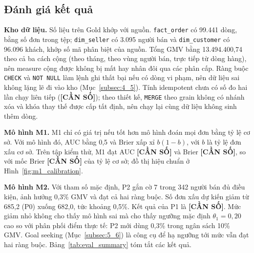 \documentclass[a4paper]{article}
\begin{document}
\subsection{Đánh giá kết quả}
\label{subsec:6_2}

\textbf{Kho dữ liệu.} Số liệu trên Gold khớp với nguồn. \texttt{fact\_order} có 99.441 dòng, bằng số đơn trong tệp; \texttt{dim\_seller} có 3.095 người bán và \texttt{dim\_customer} có 96.096 khách, khớp số mã phân biệt của nguồn. Tổng GMV bằng 13.494.400,74 theo cả ba cách cộng (theo tháng, theo vùng người bán, trực tiếp từ dòng hàng), nên measure cộng được không bị mất hay nhân đôi qua các phân cấp. Ràng buộc \texttt{CHECK} và \texttt{NOT NULL} làm lệnh ghi thất bại nếu có dòng vi phạm, nên dữ liệu sai không lặng lẽ đi vào kho (Mục~\ref{subsec:4_5}). Tính idempotent chưa có số đo hai lần chạy liên tiếp (\textbf{[CẦN SỐ]}); theo thiết kế, \texttt{MERGE} theo grain không có nhánh xóa và khóa thay thế được cấp tất định, nên chạy lại cùng dữ liệu không sinh thêm dòng.

\textbf{Mô hình M1.} M1 chỉ có giá trị nếu tốt hơn mô hình đoán mọi đơn bằng tỷ lệ cơ sở. Với mô hình đó, AUC bằng 0,5 và Brier xấp xỉ $b(1-b)$, với $b$ là tỷ lệ đơn xấu cơ sở. Trên tập kiểm thử, M1 đạt AUC \textbf{[CẦN SỐ]} và Brier \textbf{[CẦN SỐ]}, so với mốc Brier \textbf{[CẦN SỐ]} của tỷ lệ cơ sở; đồ thị hiệu chuẩn ở Hình~\ref{fig:m1_calibration}.

\textbf{Mô hình M2.} Với tham số mặc định, P2 gắn cờ 7 trong 342 người bán đủ điều kiện, ảnh hưởng 0,3\% GMV và đạt cả hai ràng buộc. Số đơn xấu dự kiến giảm từ 685,2 (P0) xuống 682,0, tức khoảng 0,5\%. Kết quả của P1 là \textbf{[CẦN SỐ]}. Mức giảm nhỏ không cho thấy mô hình sai mà cho thấy ngưỡng mặc định $\theta_1 = 0{,}20$ cao so với phân phối điểm thực tế: P2 mới dùng 0,3\% trong ngân sách 10\% GMV. Goal seeking (Mục~\ref{subsec:5_6}) là công cụ để hạ ngưỡng tới mức vẫn đạt hai ràng buộc. Bảng~\ref{tab:eval_summary} tóm tắt các kết quả.
\end{document}
